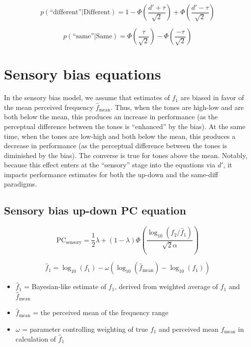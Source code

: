 \documentclass[11pt]{article}
\begin{document}
\begin{equation}
		p(\text{``different''}|\text{Different}) = 1 - \Phi\left( \frac{d' + \tau}{\sqrt{2}} \right) + \Phi\left(\frac{d' -\tau}{\sqrt{2}} \right) 
\end{equation}

\begin{equation}
		p(\text{``same''}|\text{Same}) = \Phi\left( \frac{\tau}{\sqrt{2}} \right) - \Phi\left(\frac{-\tau}{\sqrt{2}} \right) 
\end{equation}

\section{Sensory bias equations}

In the sensory bias model, we assume that estimates of $f_1$ are biased in favor of the mean perceived frequency $\hat{f}_\text{mean}$. 
Thus, when the tones are high-low and are both below the mean, this produces an increase in performance (as the perceptual difference between the tones is ``enhanced'' by the bias). 
At the same time, when the tones are low-high and both below the mean, this produces a decrease in performance (as the perceptual difference between the tones is diminished by the bias). 
The converse is true for tones above the mean.
Notably, because this effect enters at the ``sensory'' stage into the equations via $d'$, it impacts performance estimates for both the up-down and the same-diff paradigms.

\subsection{Sensory bias up-down PC equation}

\begin{equation}
		\text{PC}_\text{sensory} = \frac{1}{2} \lambda + (1 - \lambda) \Phi \left(\frac{\log_{10}(f_2/\hat{f}_1)}{\sqrt{2}\alpha} \right)
\end{equation}

\begin{equation}
		\hat{f}_1 = \log_{10}(f_1) - \omega \left( \log_{10}(\hat{f}_\text{mean}) - \log_{10}(f_1) \right)
\end{equation}

\begin{itemize}
	\item $\hat{f}_1$ = Bayesian-like estimate of $f_1$, derived from weighted average of $f_1$ and $\hat{f}_\text{mean}$
	\item  $\hat{f}_\text{mean}$ = the perceived mean of the frequency range
	\item $\omega$ = parameter controlling weighting of true $f_1$ and perceived mean $\hat{f}_\text{mean}$ in calculation of $\hat{f}_1$
\end{itemize}
\end{document}
